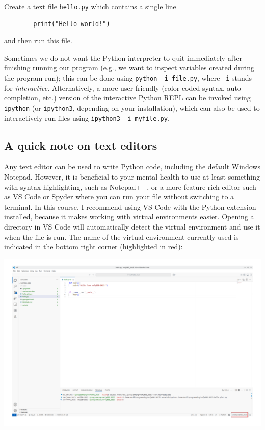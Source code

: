 \begin{exercise}
    Create a text file \verb|hello.py| which contains a single line
    \begin{lstlisting}
        print("Hello world!")
    \end{lstlisting}
    and then run this file.
\end{exercise}

Sometimes we do not want the Python interpreter to quit immediately after finishing running our program (e.g., we want to inspect variables created during the program run); this can be done using \verb|python -i file.py|, where \verb|-i| stands for \emph{interactive}. Alternatively, a more user-friendly (color-coded syntax, auto-completion, etc.) version of the interactive Python REPL can be invoked using \verb|ipython| (or \verb|ipython3|, depending on your installation), which can also be used to interactively run files using \verb|ipython3 -i myfile.py|.

\subsection{A quick note on text editors}
Any text editor can be used to write Python code, including the default Windows Notepad. However, it is beneficial to your mental health to use at least something with syntax highlighting, such as Notepad++, or a more feature-rich editor such as VS Code or Spyder where you can run your file without switching to a terminal. In this course, I recommend using VS Code with the Python extension installed, because it makes working with virtual environments easier. Opening a directory in VS Code will automatically detect the virtual environment and use it when the file is run. The name of the virtual environment currently used is indicated in the bottom right corner (highlighted in red):
\begin{center}
    \includegraphics[width=0.9\linewidth]{vscode.png}
\end{center}


